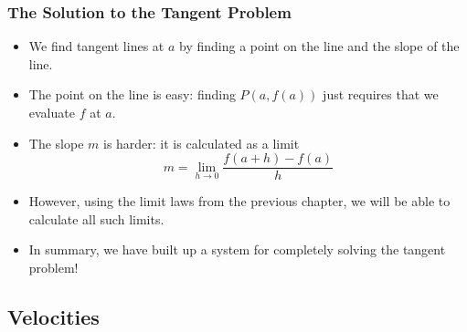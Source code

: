 \documentclass[serif,ignorenonframetext]{beamer}
\begin{document}
\begin{frame}
  \frametitle{The Solution to the Tangent Problem}
  \begin{itemize}
  \item We find tangent lines at $a$ by finding a point on the line and the 
    slope of the line.
  \pause
  \item The point on the line is easy: finding $P(a,f(a))$ just requires
    that we evaluate $f$ at $a$.
  \pause
  \item The slope $m$ is harder: it is calculated as a limit
    \begin{displaymath}
      m=\lim_{h\to 0} \frac{f(a+h)-f(a)}{h}
    \end{displaymath}
  \pause
  \item However, using the limit laws from the previous chapter, we will
    be able to calculate all such limits.
  \pause
  \item In summary, we have built up a system for completely solving the
    tangent problem!
  \end{itemize}
\end{frame}


\subsection{Velocities}
\end{document}
